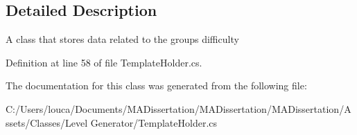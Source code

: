 \subsection{Detailed Description}
A class that stores data related to the groups difficulty 



Definition at line 58 of file Template\+Holder.\+cs.



The documentation for this class was generated from the following file\+:\begin{DoxyCompactItemize}
\item 
C\+:/\+Users/louca/\+Documents/\+M\+A\+Dissertation/\+M\+A\+Dissertation/\+M\+A\+Dissertation/\+Assets/\+Classes/\+Level Generator/Template\+Holder.\+cs\end{DoxyCompactItemize}

